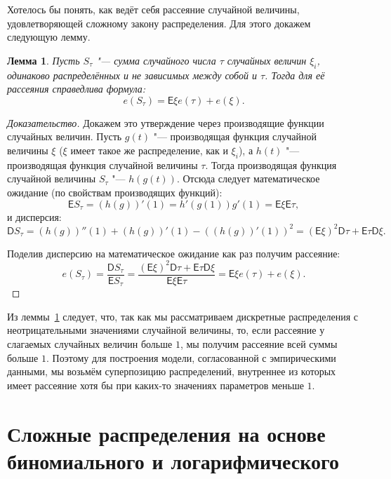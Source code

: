 \documentclass[12pt, specialist, subf, substylefile = spbu_report.rtx]{disser}
\newtheorem{lemma}{Лемма}
\begin{document}
	Хотелось бы понять, как ведёт себя рассеяние случайной величины, удовлетворяющей сложному закону распределения. Для этого докажем следующую лемму.
	
	\begin{lemma}
		Пусть $ S _\tau $ "--- сумма случайного числа $ \tau $ случайных величин $ \xi _i $, одинаково распределённых и не зависимых между собой и $ \tau $. Тогда для её рассеяния справедлива формула:
		\[ e (S _\tau) = \mathsf{E} \xi e (\tau) + e (\xi). \] 
		\label{lemma:1}
	\end{lemma}
	
	\begin{proof}[Доказательство]
		Докажем это утверждение через производящие функции случайных величин. Пусть $ g(t) $ "--- производящая функция случайной величины $ \xi $ ($ \xi $ имеет такое же распределение, как и $ \xi _i $), а $ h(t) $ "--- производящая функция случайной величины $ \tau $. Тогда производящая функция случайной величины $ S _\tau $ "--- $ h(g(t)) $.
		Отсюда следует математическое ожидание (по свойствам производящих функций):
		\[ \mathsf{E} S _\tau = \left( h(g) \right)' (1) = h'(g(1)) g'(1) = \mathsf{E} \xi \mathsf{E} \tau, \]
		и дисперсия:
		\[ \mathsf{D} S _\tau = \left(h(g)\right)'' (1) + \left(h(g)\right)' (1) - \left( \left(h(g)\right)' (1) \right) ^2 = \left( \mathsf{E} \xi \right) ^2 \mathsf{D} \tau + \mathsf{E} \tau \mathsf{D} \xi. \]
		
		Поделив дисперсию на математическое ожидание как раз получим рассеяние:
		\[ e (S _\tau) = \frac {\mathsf{D} S _\tau} {\mathsf{E} S _\tau} = \frac {\left( \mathsf{E} \xi \right) ^2 \mathsf{D} \tau + \mathsf{E} \tau \mathsf{D} \xi} {\mathsf{E} \xi \mathsf{E} \tau} = \mathsf{E} \xi e (\tau) + e (\xi). \]
	\end{proof}
	
	Из леммы~\ref{lemma:1} следует, что, так как мы рассматриваем дискретные распределения с неотрицательными значениями случайной величины, то, если рассеяние у слагаемых случайных величин больше $ 1 $, мы получим рассеяние всей суммы больше $ 1 $. Поэтому для построения модели, согласованной с эмпирическими данными, мы возьмём суперпозицию распределений, внутреннее из которых имеет рассеяние хотя бы при каких-то значениях параметров меньше $ 1 $.
	
	\chapter{Сложные распределения на основе биномиального и логарифмического}
	
\end{document}
